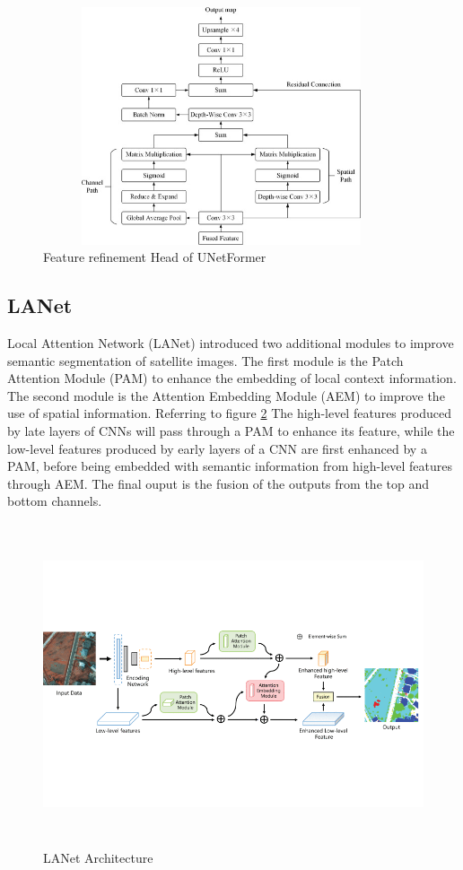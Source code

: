 \FloatBarrier

\begin{figure}[ht]
\includegraphics[width=10.5cm, height=7cm]{images/frh.jpg}
\centering
\caption{Feature refinement Head of UNetFormer}
\label{fig:frh}
\end{figure}

\FloatBarrier

\subsection{LANet}
Local Attention Network (LANet) \cite{lanet}introduced two additional modules to improve semantic segmentation of satellite images. The first module is the Patch Attention Module (PAM) to enhance the embedding of local context information. The second module is the Attention Embedding Module (AEM) to improve the use of spatial information. Referring to figure \ref{fig:lanet} The high-level features produced by late layers of CNNs will pass through a PAM to enhance its feature, while the low-level features produced by early layers of a CNN are first enhanced by a PAM, before being embedded with semantic information from high-level features through AEM. The final ouput is the fusion of the outputs from the top and bottom channels. 

\FloatBarrier
\begin{figure}[ht]
\includegraphics[width=12.5cm, height=9.5cm]{images/lanet.png}
\centering
\caption{LANet Architecture}
\label{fig:lanet}
\end{figure}

